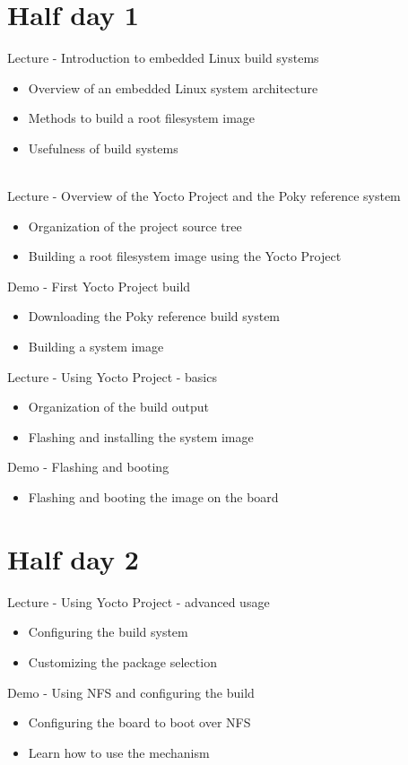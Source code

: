 \documentclass[a4paper,12pt,obeyspaces,spaces,hyphens]{article}
\begin{document}
\section{Half day 1}

\feagendaonecolumn
{Lecture - Introduction to embedded Linux build systems}
{
  \begin{itemize}
  \item Overview of an embedded Linux system architecture
  \item Methods to build a root filesystem image
  \item Usefulness of build systems
  \end{itemize}
}
\\
\feagendatwocolumn
{Lecture - Overview of the Yocto Project and the Poky reference system}
{
  \begin{itemize}
  \item Organization of the project source tree
  \item Building a root filesystem image using the Yocto Project
  \end{itemize}
}
{Demo - First Yocto Project build}
{
  \begin{itemize}
  \item Downloading the Poky reference build system
  \item Building a system image
 \end{itemize}
}

\newpage
\feagendaonecolumn
{Lecture - Using Yocto Project - basics}
{
  \begin{itemize}
  \item Organization of the build output
  \item Flashing and installing the system image
  \end{itemize}
}

\feagendaonecolumn
{Demo - Flashing and booting}
{
  \begin{itemize}
  \item Flashing and booting the image on the board
  \end{itemize}
}

\section{Half day 2}

\feagendatwocolumn
{Lecture - Using Yocto Project - advanced usage}
{
  \begin{itemize}
  \item Configuring the build system
  \item Customizing the package selection
  \end{itemize}
}
{Demo - Using NFS and configuring the build}
{
  \begin{itemize}
  \item Configuring the board to boot over NFS
  \item Learn how to use the  mechanism
  \end{itemize}
}
\\
\end{document}
